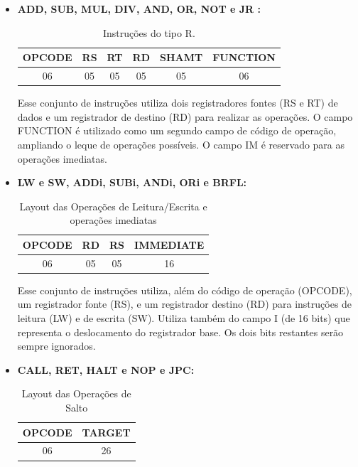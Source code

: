 \documentclass{report}
\begin{document}
  \begin{itemize}
     
     \item \textbf{ADD, SUB, MUL, DIV, AND, OR, NOT e JR :}

  \begin{table}[H]
\centering
	\begin{tabular}{|c|c|c|c|c|c|}
  	\hline 
  	\textbf{OPCODE} & \textbf{RS} & \textbf{RT} & \textbf{RD} & \textbf{SHAMT} & \textbf{FUNCTION} \\ 
  	\hline 
  	06 & 05 & 05 & 05 & 05 & 06 \\ 
  	\hline 
  	\end{tabular} 
  	\caption{Instruções do tipo R.}
  \end{table}
  
  Esse conjunto de instruções utiliza dois registradores fontes (RS e RT) de dados e um registrador de destino (RD) para realizar as operações. O campo FUNCTION é utilizado como um segundo campo de código de operação, ampliando o leque de operações possíveis. O campo IM é reservado para as operações imediatas.\\
  
   \item \textbf{LW e SW, ADDi, SUBi, ANDi, ORi e BRFL:}

  \begin{table}[H]
\centering
	\begin{tabular}{|c|c|c|c|}
  	\hline 
  	\textbf{OPCODE} & \textbf{RD} & \textbf{RS} & \textbf{IMMEDIATE}  \\ 
  	\hline 
  	06 & 05 & 05 & 16 \\ 
  	\hline 
  	\end{tabular} 
  	\caption{Layout das Operações de Leitura/Escrita e operações imediatas}
  \end{table}
  
  Esse conjunto de instruções utiliza, além do código de operação (OPCODE), um registrador fonte (RS), e um registrador destino (RD) para instruções de leitura (LW) e de escrita (SW). Utiliza também do campo I (de 16 bits) que representa o deslocamento do registrador base. Os dois bits restantes serão sempre ignorados.\\

  
  \item \textbf{CALL, RET, HALT e NOP e JPC:}

  \begin{table}[H]
\centering
	\begin{tabular}{|c|c|}
  	\hline 
  	\textbf{OPCODE} & \textbf{TARGET} \\ 
  	\hline 
  	06 & 26 \\ 
  	\hline 
  	\end{tabular} 
  	\caption{Layout das Operações de Salto}
  \end{table}
  

\end{itemize}
\end{document}
